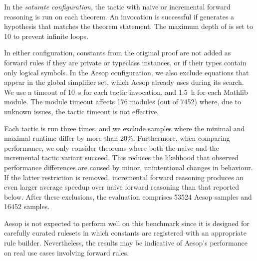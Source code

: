 In the \emph{saturate configuration}, the  tactic with naive or incremental forward reasoning is run on each theorem.
An invocation is successful if  generates a hypothesis that matches the theorem statement.
The maximum depth of  is set to 10 to prevent infinite loops.

In either configuration, constants from the original proof are not added as forward rules if they are private or typeclass instances, or if their types contain only logical symbols.
In the Aesop configuration, we also exclude equations that appear in the global simplifier set, which Aesop already uses during its search.
We use a timeout of \SI{10}{s} for each tactic invocation, and \SI{1.5}{h} for each Mathlib module.
The module timeout affects 176 modules (out of 7452) where, due to unknown issues, the tactic timeout is not effective.

Each tactic is run three times, and we exclude samples where the minimal and maximal runtime differ by more than 20\%.
Furthermore, when comparing performance, we only consider theorems where both the naive and the incremental tactic variant succeed.
This reduces the likelihood that observed performance differences are caused by minor, unintentional changes in behaviour.
If the latter restriction is removed, incremental forward reasoning produces an even larger average speedup over naive forward reasoning than that reported below.
After these exclusions, the evaluation comprises 53524 Aesop samples and 16452  samples.

Aesop is not expected to perform well on this benchmark since it is designed for carefully curated rulesets in which constants are registered with an appropriate rule builder.
Nevertheless, the results may be indicative of Aesop's performance on real use cases involving forward rules.


